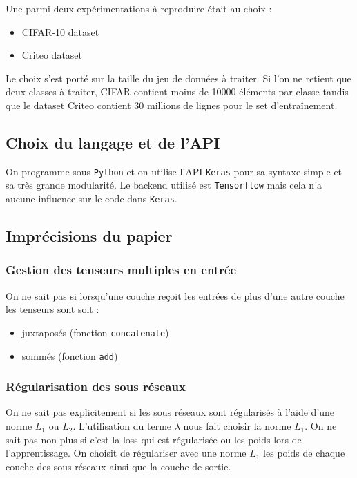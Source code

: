 \documentclass[11 pt]{article}
\begin{document}
	Une parmi deux expérimentations à reproduire était au choix :
	\begin{itemize}
		\item CIFAR-10 dataset
		\item Criteo dataset
	\end{itemize}

	Le choix s'est porté sur la taille du jeu de données à traiter. Si l'on ne retient que deux classes à traiter, CIFAR contient moins de 10000 éléments par classe tandis que le dataset Criteo contient 30 millions de lignes pour le set d'entraînement.

\subsection{Choix du langage et de l'API}
	On programme sous \texttt{Python} et on utilise l'API \texttt{Keras} pour sa syntaxe simple et sa très grande modularité. Le backend utilisé est \texttt{Tensorflow} mais cela n'a aucune influence sur le code dans \texttt{Keras}.

\subsection{Imprécisions du papier}

\subsubsection{Gestion des tenseurs multiples en entrée}
\label{subsec:mult}
On ne sait pas si lorsqu'une couche reçoit les entrées de plus d'une autre couche les tenseurs sont soit :
\begin{itemize}
	\item juxtaposés (fonction \texttt{concatenate})
	\item sommés (fonction \texttt{add})
\end{itemize}

\subsubsection{Régularisation des sous réseaux}
On ne sait pas explicitement si les sous réseaux sont régularisés à l'aide d'une norme $L_{1}$ ou $L_{2}$. L'utilisation du terme $\lambda$ nous fait choisir la norme $L_{1}$. On ne sait pas non plus si c'est la loss qui est régularisée ou les poids lors de l'apprentissage. On choisit de régulariser avec une norme $L_{1}$ les poids de chaque couche des sous réseaux ainsi que la couche de sortie.
\end{document}
